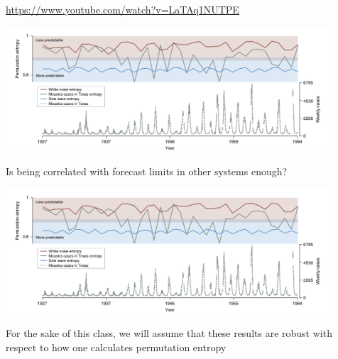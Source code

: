 \documentclass[aspectratio=169]{beamer}
\begin{document}
\begin{frame}

\url{https://www.youtube.com/watch?v=LaTAq1NUTPE}

\end{frame}
\begin{frame}

\begin{center}
\includegraphics[width = 0.9\textwidth]{figures/scarpino_on_2019_fig1}
\end{center}

\vfill
Is being correlated with forecast limits in other systems enough?
\end{frame}
\begin{frame}

\begin{center}
\includegraphics[width = 0.9\textwidth]{figures/scarpino_on_2019_fig1}
\end{center}

\vfill
For the sake of this class, we will assume that these results are robust with respect to how one calculates permutation entropy
\end{frame}
\end{document}
